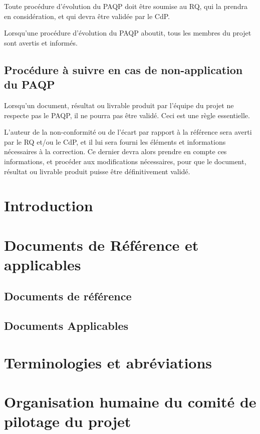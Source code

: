 \documentclass[a4paper]{article}
\begin{document}
Toute procédure d'évolution du PAQP doit être soumise au RQ, qui la prendra en considération, et qui devra être validée par le CdP.

Lorsqu'une procédure d'évolution du PAQP aboutit, tous les membres du projet sont avertis et informés.

\subsection{Procédure à suivre en cas de non-application du  PAQP}

Lorsqu'un document, résultat ou livrable produit par l'équipe du projet ne respecte pas le PAQP, il ne pourra pas être validé. Ceci est une règle essentielle.

L'auteur de la non-conformité ou de l'écart par rapport à la référence sera averti par le RQ et/ou le CdP, et il lui sera fourni les éléments et informations nécessaires à la correction. Ce dernier devra alors prendre en compte ces informations, et procéder aux modifications nécessaires, pour que le document, résultat ou livrable produit puisse être définitivement validé.

\section{Introduction}

\section{Documents de Référence et applicables}


\subsection{Documents de référence}

\subsection{Documents Applicables}

\section{Terminologies et abréviations}

\section{Organisation humaine du comité de pilotage du projet}
\end{document}
